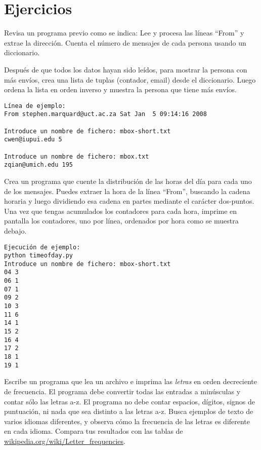 \section{Ejercicios}

\begin{ex}
Revisa un programa previo como se indica: Lee y
procesa las líneas ``From'' y extrae la
dirección. Cuenta el número de
mensajes de cada persona usando un diccionario.
	
Después de que todos los datos hayan sido leídos, para mostrar
la persona con más envíos, crea
una lista de tuplas (contador, email) desde el
diccionario. Luego ordena la lista en orden
inverso y muestra la persona que tiene más
envíos.

\beforeverb
\begin{verbatim}
Línea de ejemplo:
From stephen.marquard@uct.ac.za Sat Jan  5 09:14:16 2008

Introduce un nombre de fichero: mbox-short.txt
cwen@iupui.edu 5

Introduce un nombre de fichero: mbox.txt
zqian@umich.edu 195
\end{verbatim}
\afterverb
\end{ex}
\begin{ex}
Crea un programa que cuente la distribución de las horas del día para
cada uno de los mensajes. Puedes extraer la hora de la línea
``From'', buscando la cadena horaria y luego dividiendo esa cadena
en partes mediante el carácter dos-puntos. Una vez que tengas acumulados
los contadores para cada hora, imprime en pantalla los contadores, uno por línea,
ordenados por hora como se muestra debajo.
\beforeverb
\begin{verbatim}
Ejecución de ejemplo:
python timeofday.py
Introduce un nombre de fichero: mbox-short.txt
04 3
06 1
07 1
09 2
10 3
11 6
14 1
15 2
16 4
17 2
18 1
19 1
\end{verbatim}
\afterverb
\end{ex}


\begin{ex}
Escribe un programa que lea un archivo e
imprima las {\em letras} en orden decreciente de frecuencia. El programa
debe convertir todas las entradas a minúsculas y contar sólo las letras a-z.
El programa no debe contar espacios, dígitos, signos de puntuación, ni nada
que sea distinto a las letras a-z.
Busca ejemplos de texto de varios idiomas diferentes, y observa cómo la frecuencia
de las letras es diferente en cada idioma. Compara tus resultados con las tablas de
\url{wikipedia.org/wiki/Letter_frequencies}.


\end{ex}

